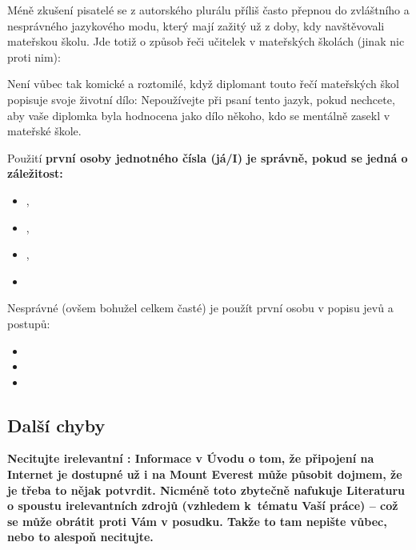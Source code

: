 Méně zkušení pisatelé se z autorského plurálu příliš často přepnou do zvláštního a nesprávného jazykového modu, který mají zažitý už z doby, kdy navštěvovali mateřskou školu. Jde totiž o způsob řeči učitelek v mateřských školách (jinak nic proti nim): 

Není vůbec tak komické a roztomilé, když diplomant touto řečí mateřských škol popisuje svoje životní dílo:  Nepoužívejte při psaní tento jazyk, pokud nechcete, aby vaše diplomka byla hodnocena jako dílo někoho, kdo se mentálně zasekl v mateřské škole.

Použití \bf první osoby jednotného čísla \rm (já/I) je správně, pokud se jedná o  záležitost:
\begin{itemize}
  \item{},
  \item{},
  \item{},
  \item{}
\end{itemize}

Nesprávné (ovšem bohužel celkem časté) je použít první osobu v popisu jevů a postupů:
\begin{itemize}
  \item{}
  \item{}
  \item{}
\end{itemize}

\subsection*{Další chyby}

\bf Necitujte irelevantní : \rm Informace v Úvodu o tom, že připojení na Internet je dostupné už i na Mount Everest může působit dojmem, že je třeba to nějak potvrdit. Nicméně toto zbytečně nafukuje Literaturu o spoustu irelevantních zdrojů (vzhledem k~tématu Vaší práce) -- což se může obrátit proti Vám v posudku. Takže to tam nepište vůbec, nebo to alespoň necitujte.

